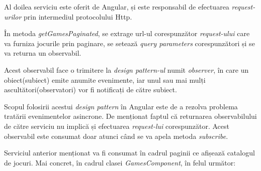 \documentclass[12pt,a4paper]{report}
\begin{document}
Al doilea serviciu este oferit de Angular, și este responsabil de efectuarea \emph{request-urilor} prin intermediul protocolului Http.

În metoda \emph{getGamesPaginated}, se extrage url-ul corespunzător \emph{request-ului} care va furniza jocurile prin paginare, se setează \emph{query parameters} corespunzători și se va returna un observabil.

Acest observabil face o trimitere la \emph{design pattern-ul} numit \emph{observer}, în care un obiect(subiect) emite anumite evenimente, iar unul sau mai mulți ascultători(observatori) vor fi notificați de către subiect. \cite{33}

Scopul folosirii acestui \emph{design pattern} în Angular este de a rezolva problema tratării evenimentelor asincrone. De menționat faptul că returnarea observabilului de către serviciu nu implică și efectuarea \emph{request-lui} corespunzător. Acest observabil este consumat doar atunci când se va apela metoda \emph{subscribe}.

Serviciul anterior menționat va fi consumat în cadrul paginii ce afișează catalogul de jocuri. Mai concret, în cadrul clasei \emph{GamesComponent}, în felul următor:
\end{document}
